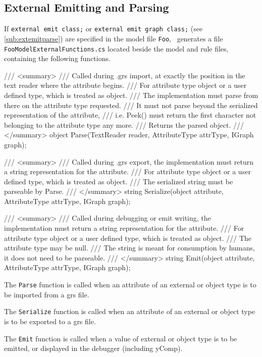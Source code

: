 \subsection*{External Emitting and Parsing}\label{sub:apiextemitparse}
If \texttt{external emit class;} or \texttt{external emit graph class;} (see \ref{sub:extemitparse}) are specified in the model file \texttt{Foo}, \GrG~generates a file \texttt{FooModelExternalFunctions.cs} located beside the model and rule files,
containing the following functions.

\begin{csharplet}
/// <summary>
/// Called during .grs import, at exactly the position in the text reader where the attribute begins.
/// For attribute type object or a user defined type, which is treated as object.
/// The implementation must parse from there on the attribute type requested.
/// It must not parse beyond the serialized representation of the attribute, 
/// i.e. Peek() must return the first character not belonging to the attribute type any more.
/// Returns the parsed object.
/// </summary>
object Parse(TextReader reader, AttributeType attrType, IGraph graph);

/// <summary>
/// Called during .grs export, the implementation must return a string representation for the attribute.
/// For attribute type object or a user defined type, which is treated as object.
/// The serialized string must be parseable by Parse.
/// </summary>
string Serialize(object attribute, AttributeType attrType, IGraph graph);

/// <summary>
/// Called during debugging or emit writing, the implementation must return a string representation for the attribute.
/// For attribute type object or a user defined type, which is treated as object.
/// The attribute type may be null.
/// The string is meant for consumption by humans, it does not need to be parseable.
/// </summary>
string Emit(object attribute, AttributeType attrType, IGraph graph);
\end{csharplet}

\pagebreak

The \texttt{Parse} function is called when an attribute of an external or object type is to be imported from a grs file.

The \texttt{Serialize} function is called when an attribute of an external or object type is to be exported to a grs file.

The \texttt{Emit} function is called when a value of external or object type is to be emitted, or displayed in the debugger (including yComp).

